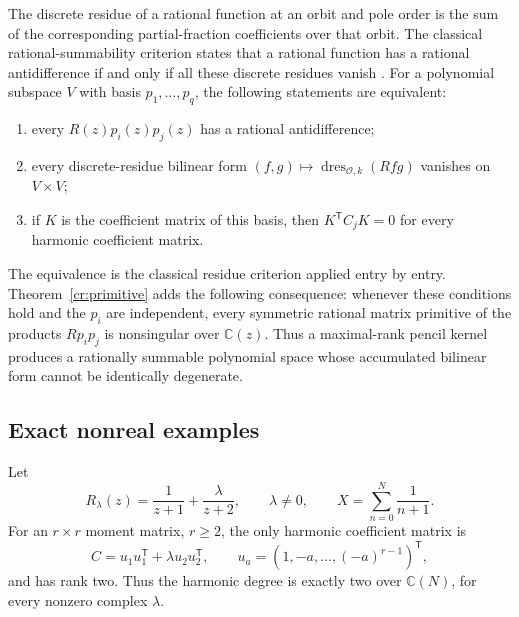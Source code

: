 \documentclass[11pt,a4paper]{article}
\theoremstyle{definition}
\theoremstyle{remark}
\numberwithin{equation}{section}
\begin{document}
The discrete residue of a rational function at an orbit and pole
order is the sum of the corresponding partial-fraction coefficients
over that orbit.  The classical rational-summability criterion states
that a rational function has a rational antidifference if and only if
all these discrete residues vanish \cite[Proposition~2.5]{ChenSinger2012}.
For a polynomial subspace $V$ with basis $p_1,\ldots,p_q$, the
following statements are equivalent:
\begin{enumerate}
\item every $R(z)p_i(z)p_j(z)$ has a rational antidifference;
\item every discrete-residue bilinear form
$(f,g)\mapsto\operatorname{dres}_{\mathcal O,k}(Rfg)$ vanishes
on $V\times V$;
\item if $K$ is the coefficient matrix of this basis, then
$K^{\mathsf T}C_jK=0$ for every harmonic coefficient matrix.
\end{enumerate}
The equivalence is the classical residue criterion applied entry by
entry.  Theorem~\ref{cr:primitive} adds the following consequence:
whenever these conditions hold and the $p_i$ are independent, every
symmetric rational matrix primitive of the products $Rp_ip_j$ is
nonsingular over $\mathbb C(z)$.  Thus a maximal-rank pencil kernel
produces a rationally summable polynomial space whose accumulated
bilinear form cannot be identically degenerate.

\subsection{Exact nonreal examples}

Let
\[
 R_\lambda(z)=\frac1{z+1}+\frac\lambda{z+2},\qquad\lambda\ne0,
 \qquad X=\sum_{n=0}^N\frac1{n+1}.
\]
For an $r\times r$ moment matrix, $r\ge2$, the only harmonic
coefficient matrix is
\[
 C=u_1u_1^{\mathsf T}+\lambda u_2u_2^{\mathsf T},\qquad
 u_a=(1,-a,\ldots,(-a)^{r-1})^{\mathsf T},
\]
and has rank two.  Thus the harmonic degree is exactly two over
$\mathbb C(N)$, for every nonzero complex $\lambda$.
\end{document}
